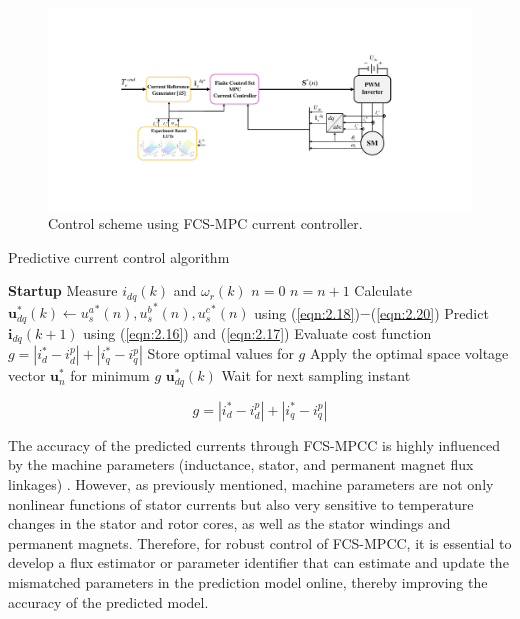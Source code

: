 \begin{figure}[t]
    \centering
    \includegraphics[scale=0.6]{chapters/Fig2.6.pdf}
    \caption{Control scheme using FCS-MPC current controller.}
    \label{Fig:2.6}
\end{figure}
\begin{algorithm}[!]
\caption{Predictive current control algorithm}
\begin{algorithmic}[1]
\STATE \textbf{Startup}
\STATE Measure $i_{dq}(k)$ and $\omega_r(k)$
\STATE $n = 0$
\STATE $n = n + 1$
\STATE Calculate $\mathbf{u}^*_{dq}(k) \leftarrow {u_{s}^a}^*(n),{u_{s}^b}^*(n),{u_{s}^c}^*(n)$ using (\ref{eqn:2.18})$-$(\ref{eqn:2.20})
\STATE Predict $\mathbf{i}_{dq}(k+1)$ using (\ref{eqn:2.16}) and (\ref{eqn:2.17})
\STATE Evaluate cost function $g = |i_{d}^* - i_{d}^p| + |i_{q}^* - i_{q}^p|$
\STATE Store optimal values for $g$
\ENDFOR
{}
    \STATE Apply the optimal space voltage vector $\mathbf{u}^*_n$ for minimum $g$
\ENDIF
\RETURN $\mathbf{u}^*_{dq}(k)$
\STATE Wait for next sampling instant
\end{algorithmic}\label{Algorithm:2.1}
\end{algorithm}
\begin{equation}\label{eqn:2.24}
g = \left| i_{d}^* - i_{d}^p \right| + \left| i_{q}^* - i_{q}^p \right|
\end{equation}

The accuracy of the predicted currents through FCS-MPCC is highly influenced by the machine parameters (inductance, stator, and permanent magnet flux linkages) \cite{c2.2_4}. However, as previously mentioned, machine parameters are not only nonlinear functions of stator currents but also very sensitive to temperature changes in the stator and rotor cores, as well as the stator windings and permanent magnets. Therefore, for robust control of FCS-MPCC, it is essential to develop a flux estimator or parameter identifier that can estimate and update the mismatched parameters in the prediction model online, thereby improving the accuracy of the predicted model.

